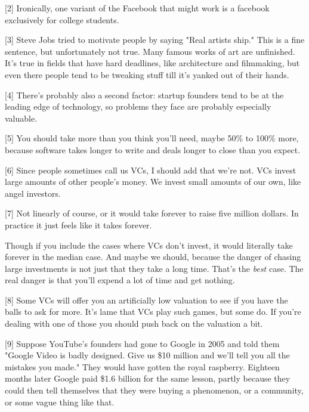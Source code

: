 [2] Ironically, one variant of the Facebook that might work
                    is a facebook exclusively for college students.

[3] Steve Jobs tried to motivate people by saying "Real
                    artists ship." This is a fine sentence, but unfortunately
                    not true. Many famous works of art are unfinished. It's true
                    in fields that have hard deadlines, like architecture and
                    filmmaking, but even there people tend to be tweaking stuff
                    till it's yanked out of their hands.

[4] There's probably also a second factor: startup founders
                    tend to be at the leading edge of technology, so problems
                    they face are probably especially valuable.

[5] You should take more than you think you'll need, maybe
                    50\% to 100\% more, because software takes longer to write and
                    deals longer to close than you expect.

[6] Since people sometimes call us VCs, I should add that
                    we're not. VCs invest large amounts of other people's money.
                    We invest small amounts of our own, like angel investors.

[7] Not linearly of course, or it would take forever to raise
                    five million dollars. In practice it just feels like it
                    takes forever.

Though if you include the cases
                    where VCs don't invest, it would literally take forever in
                    the median case. And maybe we should, because the danger of
                    chasing large investments is not just that they take a long
                    time. That's the \emph{best} case. The real danger is that
                    you'll expend a lot of time and get nothing.

[8] Some VCs will offer you an artificially low valuation to
                    see if you have the balls to ask for more. It's lame that
                    VCs play such games, but some do. If you're dealing with one
                    of those you should push back on the valuation a bit.

[9] Suppose YouTube's founders had gone to Google in 2005 and
                    told them "Google Video is badly designed. Give us \$10
                    million and we'll tell you all the mistakes you made." They
                    would have gotten the royal raspberry. Eighteen months later
                    Google paid \$1.6 billion for the same lesson, partly because
                    they could then tell themselves that they were buying a
                    phenomenon, or a community, or some vague thing like
                    that.

